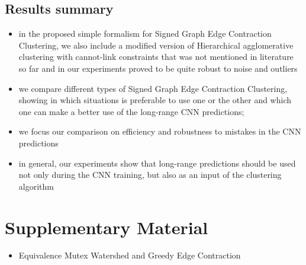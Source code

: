 \documentclass[10pt,twocolumn,letterpaper]{article}
\begin{document}
\subsection{Results summary}
\begin{itemize}
\item in the proposed simple formalism for Signed Graph Edge Contraction Clustering, we also include a modified version of Hierarchical agglomerative clustering with cannot-link constraints that was not mentioned in literature so far and in our experiments proved to be quite robust to noise and outliers
\item we compare different types of Signed Graph Edge Contraction Clustering, showing in which situations is preferable to use one or the other and which one can make a better use of the long-range CNN predictions; 
\item we focus our comparison on efficiency and robustness to mistakes in the CNN predictions 
\item in general, our experiments show that long-range predictions should be used not only during the CNN training, but also as an input of the clustering algorithm

\end{itemize}

{\small


}

\section{Supplementary Material}
\begin{itemize}
\item Equivalence Mutex Watershed and Greedy Edge Contraction
\end{itemize}
\end{document}
